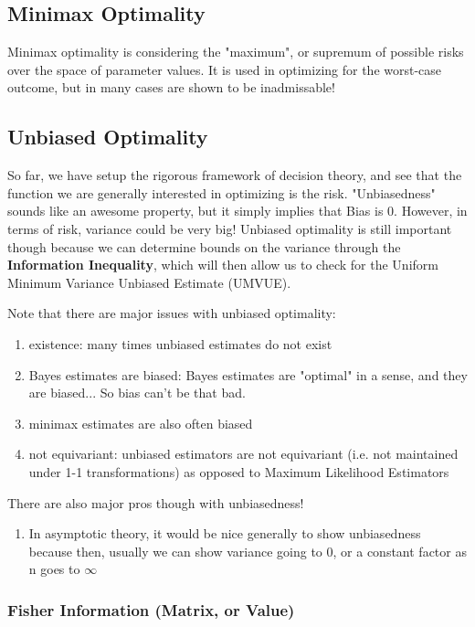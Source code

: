 	\subsection{Minimax Optimality}

		Minimax optimality is considering the "maximum", or supremum of possible risks over the space of parameter values. It is used in optimizing for the worst-case outcome, but in many cases are shown to be inadmissable!

	\subsection{Unbiased Optimality}

		So far, we have setup the rigorous framework of decision theory, and see that the function we are generally interested in optimizing is the risk. "Unbiasedness" sounds like an awesome property, but it simply implies that Bias is 0. However, in terms of risk, variance could be very big! Unbiased optimality is still important though because we can determine bounds on the variance through the \textbf{Information Inequality}, which will then allow us to check for the Uniform Minimum Variance Unbiased Estimate (UMVUE).

		Note that there are major issues with unbiased optimality:

		\begin{enumerate}
			\item existence: many times unbiased estimates do not exist
			\item Bayes estimates are biased: Bayes estimates are "optimal" in a sense, and they are biased... So bias can't be that bad.
			\item minimax estimates are also often biased
			\item not equivariant: unbiased estimators are not equivariant (i.e. not maintained under 1-1 transformations) as opposed to Maximum Likelihood Estimators
		\end{enumerate}

		There are also major pros though with unbiasedness!

		\begin{enumerate}
			\item In asymptotic theory, it would be nice generally to show unbiasedness because then, usually we can show variance going to 0, or a constant factor as n goes to $\infty$
		\end{enumerate}

		\subsubsection{Fisher Information (Matrix, or Value)}

